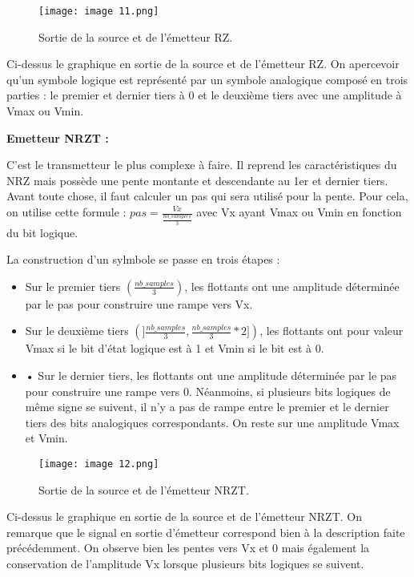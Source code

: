 \begin{figure}[H]
    \centering
    \texttt{[image: image 11.png]}
    \caption{\label{fig:image11}Sortie de la source et de l'émetteur RZ.}
\end{figure}

Ci-dessus le graphique en sortie de la source et de l'émetteur RZ. On apercevoir qu'un symbole logique est représenté par un symbole analogique composé en trois parties : le premier et dernier tiers à 0 et le deuxième tiers avec une amplitude à Vmax ou Vmin.

\textbf{Emetteur NRZT :}

C'est le transmetteur le plus complexe à faire. Il reprend les caractéristiques du NRZ mais possède une pente montante et descendante au 1er et dernier tiers. Avant toute chose, il faut calculer un pas qui sera utilisé pour la pente. Pour cela, on utilise cette formule : $ pas = \frac{Vx}{\frac{nb\_samples}{3}} $ avec Vx ayant Vmax ou Vmin en fonction du bit logique.

La construction d'un sylmbole se passe en trois étapes :
\begin{itemize}
    \item Sur le premier tiers $ \left(\frac{nb\_samples}{3} \right) $, les flottants ont une amplitude déterminée par le pas pour construire une rampe vers Vx.
    \item Sur le deuxième tiers $(]\frac{nb\_samples}{3}, \frac{nb\_samples}{3}*2]) $, les flottants ont pour valeur Vmax si le bit d'état logique est à 1 et Vmin si le bit est à 0.
    \item •	Sur le dernier tiers, les flottants ont une amplitude déterminée par le pas pour construire une rampe vers 0. Néanmoins, si plusieurs bits logiques de même signe se suivent, il n'y a pas de rampe entre le premier et le dernier tiers des bits analogiques correspondants. On reste sur une amplitude Vmax et Vmin.
\end{itemize}

\begin{figure}[H]
    \centering
    \texttt{[image: image 12.png]}
    \caption{\label{fig:image12}Sortie de la source et de l'émetteur NRZT.}
\end{figure}

Ci-dessus le graphique en sortie de la source et de l'émetteur NRZT. On remarque que le signal en sortie d'émetteur correspond bien à la description faite précédemment. On observe bien les pentes vers Vx et 0 mais également la conservation de l'amplitude Vx lorsque plusieurs bits logiques se suivent.

